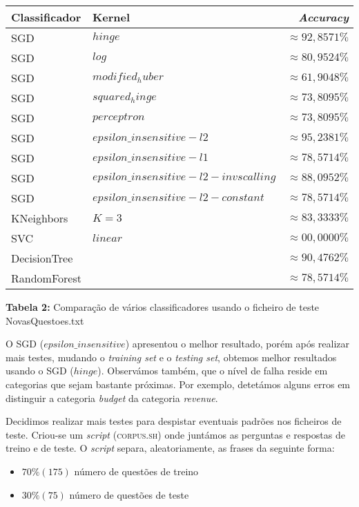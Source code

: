 \documentclass[12pt]{article}
\begin{document}
\begin{center}
    \begin{tabular}{ l | l | r }
      \hline
      \textbf{Classificador} & \textbf{Kernel} & \textbf{\textit{Accuracy}} \\ \hline
      SGD & $hinge$ & $\approx 92,8571\%$ \\ \hline
      SGD & $log$ & $\approx 80,9524\%$ \\ \hline
      SGD & $modified_huber$ & $\approx 61,9048\%$ \\ \hline
      SGD & $squared_hinge$ & $\approx 73,8095\%$ \\ \hline
      SGD & $perceptron$ & $\approx 73,8095\%$ \\ \hline
      SGD & $epsilon\_insensitive-l2$ & $\approx 95,2381\%$ \\ \hline
      SGD & $epsilon\_insensitive-l1$ & $\approx 78,5714\%$ \\ \hline
      SGD & $epsilon\_insensitive-l2-invscalling$ & $\approx 88,0952\%$ \\ \hline
      SGD & $epsilon\_insensitive-l2-constant$ & $\approx 78,5714\%$ \\ \hline
      KNeighbors & $K = 3$ & $\approx 83,3333\%$ \\ \hline
      SVC & $linear$ & $\approx 00,0000\%$ \\ \hline
      DecisionTree & $ $ & $\approx 90,4762\%$ \\ \hline
      RandomForest & $ $ & $\approx 78,5714\%$ \\ \hline
      
      
    \end{tabular}
  \end{center}
  \textbf{Tabela 2:} Comparação de vários classificadores usando o ficheiro de teste NovasQuestoes.txt \newline

  O SGD ($epsilon\_insensitive$) apresentou o melhor resultado, porém após realizar mais testes, mudando
o \textit{training set} e o \textit{testing set}, obtemos melhor resultados usando o SGD ($hinge$).
Observámos também, que o nível de falha reside em categorias que sejam bastante próximas. Por exemplo, 
detetámos alguns erros em distinguir a categoria \textit{budget} da categoria \textit{revenue}. \newline

Decidimos realizar mais testes para despistar eventuais padrões nos ficheiros de teste. Criou-se um \textit{script}
(\textsc{corpus.sh}) onde juntámos as perguntas e respostas de treino e de teste.
O \textit{script} separa, aleatoriamente, as frases da seguinte forma:
\begin{itemize}
  \item{$70\% (175)$ número de questões de treino}
  \item{$30\% (75)$ número de questões de teste}
\end{itemize}
\end{document}
